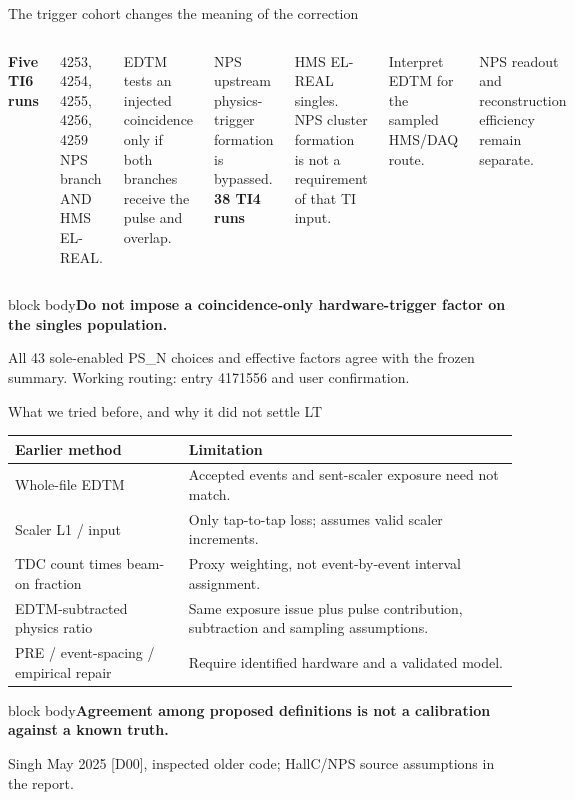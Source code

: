 \documentclass[aspectratio=169,11pt]{beamer}
\newcommand{\source}[1]{\par\vfill{\scriptsize\color{muted}#1\par}}
\newcommand{\takeaway}[1]{\begin{beamercolorbox}[sep=2.5mm,wd=\linewidth]{block body}\textbf{#1}\end{beamercolorbox}}
\begin{document}
\begin{frame}{The trigger cohort changes the meaning of the correction}
\begin{columns}[T]
\textbf{Five TI6 runs}\par\small
4253, 4254, 4255, 4256, 4259\\
NPS branch AND HMS EL-REAL.
\vspace{3mm}\par EDTM tests an injected coincidence only if both branches receive the pulse and overlap.
\vspace{2mm}\par NPS upstream physics-trigger formation is bypassed.
\textbf{38 TI4 runs}\par\small
HMS EL-REAL singles.\\
NPS cluster formation is not a requirement of that TI input.
\vspace{3mm}\par Interpret EDTM for the sampled HMS/DAQ route.
\vspace{2mm}\par NPS readout and reconstruction efficiency remain separate.
\end{columns}\vspace{4mm}
\takeaway{Do not impose a coincidence-only hardware-trigger factor on the singles population.}
\source{All 43 sole-enabled PS\_N choices and effective factors agree with the frozen summary. Working routing: entry 4171556 and user confirmation.}
\end{frame}

\begin{frame}{What we tried before, and why it did not settle LT}
\small\renewcommand{\arraystretch}{1.18}
\begin{tabular}{@{}p{.26\linewidth}p{.66\linewidth}@{}}\toprule
Earlier method & Limitation\\\midrule
Whole-file EDTM & Accepted events and sent-scaler exposure need not match.\\
Scaler L1 / input & Only tap-to-tap loss; assumes valid scaler increments.\\
TDC count times beam-on fraction & Proxy weighting, not event-by-event interval assignment.\\
EDTM-subtracted physics ratio & Same exposure issue plus pulse contribution, subtraction and sampling assumptions.\\
PRE / event-spacing / empirical repair & Require identified hardware and a validated model.\\\bottomrule
\end{tabular}\vspace{3mm}
\takeaway{Agreement among proposed definitions is not a calibration against a known truth.}
\source{Singh May 2025 [D00], inspected older code; HallC/NPS source assumptions in the report.}
\end{frame}
\end{document}
